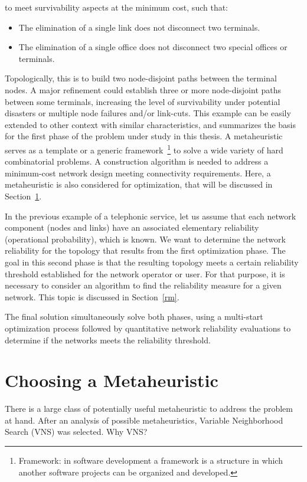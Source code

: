 to meet survivability aspects at the minimum cost, such that:
\begin{itemize}
    \item The elimination of a single link does not disconnect two terminals. 
    \item The elimination of a single office does not disconnect two special offices or terminals.
\end{itemize}
Topologically, this is to build two node-disjoint paths between the terminal nodes. 
A major refinement could establish three or more node-disjoint paths between some terminals, increasing the 
level of survivability under potential disasters or multiple node failures and/or link-cuts. 
This example can be easily extended to other context with similar characteristics, and summarizes the 
basis for the first phase of the problem under study in this thesis. A metaheuristic serves as a template or a generic framework~\footnote{Framework: in software development a framework is a structure in which another software projects can be organized and developed.} to solve a wide variety of hard combinatorial problems. A construction algorithm is needed to address a minimum-cost network design meeting connectivity requirements. Here, a metaheuristic is also considered for optimization, that will be discussed in Section~\ref{mh}. 

In the previous example of a telephonic service, let us assume that each network component (nodes and links) 
have an associated elementary reliability (operational probability), which is known. We want to determine 
the network reliability for the topology that results from the first optimization phase. The goal in 
this second phase is that the resulting topology meets a certain reliability threshold established for 
the network operator or user. For that purpose, it is necessary to consider an algorithm to find the reliability measure for a given network. This topic is discussed in Section~\ref{rm}. 

The final solution simultaneously solve both phases, using a multi-start optimization process followed by 
quantitative network reliability evaluations to determine if the networks meets the reliability threshold. 

\section{Choosing a Metaheuristic}\label{mh}
There is a large class of potentially useful metaheuristic to address the problem at hand. After an analysis 
of possible metaheuristics, Variable Neighborhood Search (VNS) was selected. Why VNS?\\

